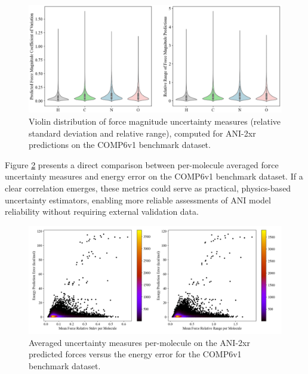 \begin{figure}[H]
    \centering
    \includegraphics[width=1\linewidth]{Images/2xr_forces/2xr_comp6v1_force-uncertainty_violin.png}
    \caption[Uncertainty in force magnitude predictions: violin distribution]{Violin distribution of force magnitude uncertainty measures (relative standard deviation and relative range), computed for ANI-2xr predictions on the COMP6v1 benchmark dataset.}
    \label{fig:2xr_comp6v1-force_uncertainty-violin}
\end{figure}

Figure \ref{fig:2xr_comp6v1-mean_force_uncertainty_hexbin} presents a direct comparison between per-molecule averaged force uncertainty measures and energy error on the COMP6v1 benchmark dataset. If a clear correlation emerges, these metrics could serve as practical, physics-based uncertainty estimators, enabling more reliable assessments of ANI model reliability without requiring external validation data.

\begin{figure}[!hp]
    \centering
    \includegraphics[width=1\linewidth]{Images/2xr_forces/2xr_comp6v1_force-mean-uncertainty-vs-energy.png}
    \caption[Average force uncertainty measures per-molecule versus energy error (COMP6v1)]{Averaged uncertainty measures per-molecule on the ANI-2xr predicted forces versus the energy error for the COMP6v1 benchmark dataset.}
    \label{fig:2xr_comp6v1-mean_force_uncertainty_hexbin}
\end{figure}

